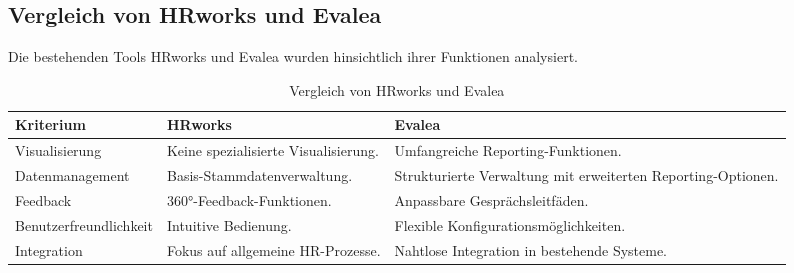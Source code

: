 \subsection{Vergleich von HRworks und Evalea}
Die bestehenden Tools HRworks und Evalea wurden hinsichtlich ihrer Funktionen analysiert.

\begin{table}[h!]
\centering
\caption{Vergleich von HRworks und Evalea}
\label{tab:vergleich_hrworks_evalea}
\begin{tabularx}{\textwidth}{|X|X|X|}
\hline
\textbf{Kriterium}              & \textbf{HRworks}                                                                 & \textbf{Evalea}                                                                 \\\hline
Visualisierung                  & Keine spezialisierte Visualisierung.                                            & Umfangreiche Reporting-Funktionen.                                             \\\hline
Datenmanagement                 & Basis-Stammdatenverwaltung.                                                     & Strukturierte Verwaltung mit erweiterten Reporting-Optionen.                   \\\hline
Feedback                        & 360°-Feedback-Funktionen.                                                      & Anpassbare Gesprächsleitfäden.                                                 \\\hline
Benutzerfreundlichkeit          & Intuitive Bedienung.                                                           & Flexible Konfigurationsmöglichkeiten.                                          \\\hline
Integration                     & Fokus auf allgemeine HR-Prozesse.                                              & Nahtlose Integration in bestehende Systeme.                                    \\\hline
\end{tabularx}
\end{table}

